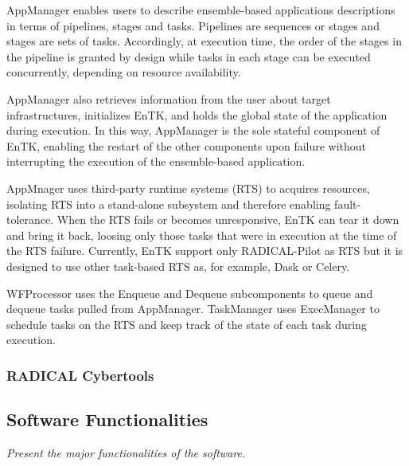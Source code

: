 \documentclass[preprint,12pt, a4paper]{elsarticle}
\begin{document}
AppManager enables users to describe ensemble-based applications descriptions
in terms of pipelines, stages and tasks. Pipelines are sequences or stages
and stages are sets of tasks. Accordingly, at execution time, the order of
the stages in the pipeline is granted by design while tasks in each stage can
be executed concurrently, depending on resource availability. 

AppManager also retrieves information from the user about target
infrastructures, initializes EnTK, and holds the global state of the
application during execution. In this way, AppManager is the sole stateful
component of EnTK, enabling the restart of the other components upon failure
without interrupting the execution of the ensemble-based application.

AppMnager uses third-party runtime systems (RTS) to acquires resources,
isolating RTS into a stand-alone subsystem and therefore enabling
fault-tolerance. When the RTS fails or becomes unresponsive, EnTK can tear it
down and bring it back, loosing only those tasks that were in execution at
the time of the RTS failure. Currently, EnTK support only RADICAL-Pilot as
RTS but it is designed to use other task-based RTS as, for example, Dask or
Celery.

WFProcessor uses the Enqueue and Dequeue subcomponents to queue and dequeue
tasks pulled from AppManager. TaskManager uses ExecManager to schedule tasks
on the RTS and keep track of the state of each task during execution.

\subsubsection{RADICAL Cybertools}\label{sssec:arch_rct}


\subsection{Software Functionalities}\label{ssec:functionalities}

{\em Present the major functionalities of the software.}
\end{document}
